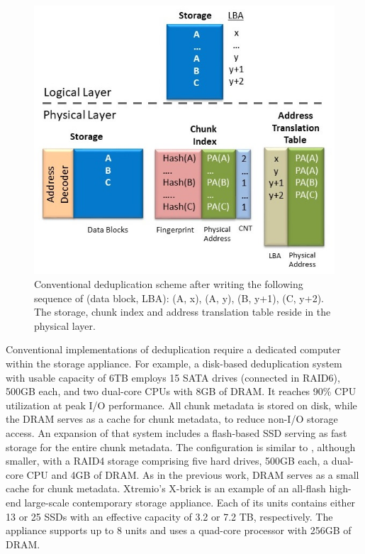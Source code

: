 \documentclass{superfri}
\begin{document}
	\begin{figure}[ht!]
		\centerline{\includegraphics[scale=0.5]{Figures/dedup_PC.jpg}}
		\caption{Conventional deduplication scheme after writing the following sequence of (data block, LBA): (A, x), (A, y), (B, y+1), (C, y+2). The storage, chunk index and address translation table reside in the physical layer.}
		\label{fig:dedup_PC}
	\end{figure}
	
	Conventional implementations of deduplication require a dedicated computer within the storage appliance. For example, a disk-based deduplication system \cite{zhu2008avoiding} with usable capacity of 6TB employs 15 SATA drives (connected in RAID6), 500GB each, and two dual-core CPUs with 8GB of DRAM. It reaches 90\% CPU utilization at peak I/O performance. All chunk metadata is stored on disk, while the DRAM serves as a cache for chunk metadata, to reduce non-I/O storage access. An expansion of that system \cite{debnath2010chunkstash} includes a flash-based SSD serving as fast storage for the entire chunk metadata. The configuration is similar to \cite{zhu2008avoiding}, although smaller, with a RAID4 storage comprising five hard drives, 500GB each, a dual-core CPU and 4GB of DRAM. As in the previous work, DRAM serves as a small cache for chunk metadata.  Xtremio's X-brick \cite{XbrickSpec} is an example of an all-flash high-end large-scale contemporary storage appliance. Each of its units contains either 13 or 25 SSDs with an effective capacity of 3.2 or 7.2 TB, respectively. The appliance supports up to 8 units and uses a quad-core processor with 256GB of DRAM. 
	
\end{document}
